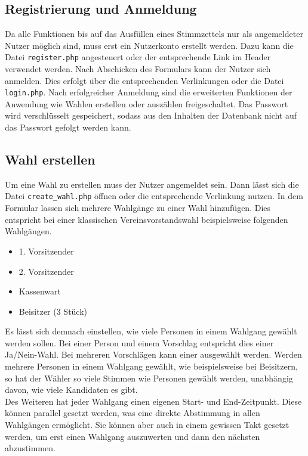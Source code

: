 \documentclass[a4paper]{scrartcl}
\newcommand{\file}[1]{\texttt{#1}}
\begin{document}
	\subsection{Registrierung und Anmeldung}
	Da alle Funktionen bis auf das Ausfüllen eines Stimmzettels nur als angemeldeter Nutzer möglich sind, muss erst ein Nutzerkonto erstellt werden. Dazu kann die Datei \file{register.php} angesteuert oder der entsprechende Link im Header verwendet werden. Nach Abschicken des Formulars kann der Nutzer sich anmelden. Dies erfolgt über die entsprechenden Verlinkungen oder die Datei \file{login.php}. Nach erfolgreicher Anmeldung sind die erweiterten Funktionen der Anwendung wie Wahlen erstellen oder auszählen freigeschaltet. Das Passwort wird verschlüsselt gespeichert, sodass aus den Inhalten der Datenbank nicht auf das Passwort gefolgt werden kann.
	
	\subsection{Wahl erstellen}
	Um eine Wahl zu erstellen muss der Nutzer angemeldet sein. Dann lässt sich die Datei \file{create\_wahl.php} öffnen oder die entsprechende Verlinkung nutzen. In dem Formular lassen sich mehrere Wahlgänge zu einer Wahl hinzufügen. Dies entspricht bei einer klassischen Vereinsvorstandswahl beispielsweise folgenden Wahlgängen.
	\begin{itemize}
		\item 1. Vorsitzender
		\item 2. Vorsitzender
		\item Kassenwart
		\item Beisitzer (3 Stück)
	\end{itemize}
	\vspace{\baselineskip}
		
	\noindent Es lässt sich demnach einstellen, wie viele Personen in einem Wahlgang gewählt werden sollen. Bei einer Person und einem Vorschlag entspricht dies einer Ja/Nein-Wahl. Bei mehreren Vorschlägen kann einer ausgewählt werden. Werden mehrere Personen in einem Wahlgang gewählt, wie beispielsweise bei Beisitzern, so hat der Wähler so viele Stimmen wie Personen gewählt werden, unabhängig davon, wie viele Kandidaten es gibt.\\
	
	\noindent Des Weiteren hat jeder Wahlgang einen eigenen Start- und End-Zeitpunkt. Diese können parallel gesetzt werden, was eine direkte Abstimmung in allen Wahlgängen ermöglicht. Sie können aber auch in einem gewissen Takt gesetzt werden, um erst einen Wahlgang auszuwerten und dann den nächsten abzustimmen.
	
\end{document}
